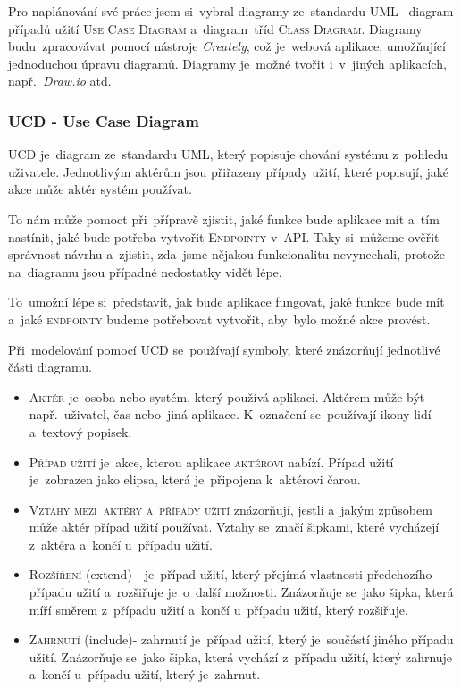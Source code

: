 \documentclass[14pt,a4paper]{article}
\begin{document}
        Pro naplánování své práce jsem si~vybral diagramy ze~standardu \textsc{UML}\,--\,diagram případů užití \textsc{Use Case Diagram} a~diagram~tříd \textsc{Class Diagram}. Diagramy budu~zpracovávat pomocí nástroje \emph{Creately}, což je~webová aplikace, umožňující jednoduchou úpravu diagramů. Diagramy je~možné tvořit i~v~jiných aplikacích, např.~\emph{Draw.io} atd.

        \subsubsection{UCD - Use Case Diagram}
        \textsc{UCD} je~diagram ze~standardu \textsc{UML}, který popisuje chování systému z~pohledu uživatele. Jednotlivým aktérům jsou přiřazeny případy užití, které popisují, jaké akce může aktér systém používat.

        To nám může pomoct při~přípravě zjistit,  jaké funkce bude aplikace mít a~tím nastínit, jaké bude potřeba vytvořit \textsc{Endpointy} v~\textsc{API}.
        Taky si~můžeme ověřit správnost návrhu a~zjistit, zda~jsme nějakou funkcionalitu nevynechali, protože na~diagramu jsou případné nedostatky vidět lépe.
        
        To~umožní lépe si~představit, jak bude aplikace fungovat, jaké funkce bude mít a~jaké \textsc{endpointy} budeme potřebovat vytvořit, aby~bylo možné akce provést. \cite{uml:usecase}

        Při~modelování pomocí \textsc{UCD} se~používají symboly, které znázorňují jednotlivé části diagramu.
        \begin{itemize}
            \item \textsc{Aktér} je~osoba nebo systém, který používá aplikaci. Aktérem může být např.~uživatel, čas nebo~jiná aplikace. K~označení se~používají ikony lidí a~textový popisek.
            \item \textsc{Případ užití} je~akce, kterou aplikace \textsc{aktérovi} nabízí. Případ užití je~zobrazen jako elipsa, která je~připojena k~aktérovi čarou.
            \item \textsc{Vztahy mezi~aktéry a~případy užití} znázorňují, jestli a~jakým způsobem může aktér případ užití používat. Vztahy se~značí šipkami, které vycházejí z~aktéra a~končí u~případu užití.
            \item \textsc{Rozšíření} (extend) - je~případ užití, který přejímá vlastnosti předchozího případu užití a~rozšiřuje je~o~další možnosti. Znázorňuje se~jako šipka, která míří směrem z~případu užití a~končí u~případu užití, který rozšiřuje.
            \item \textsc{Zahrnutí} (include)- zahrnutí je~případ užití, který je~součástí jiného případu užití. Znázorňuje se~jako šipka, která vychází z~případu užití, který zahrnuje a~končí u~případu užití, který je~zahrnut.
        \end{itemize}
\end{document}
